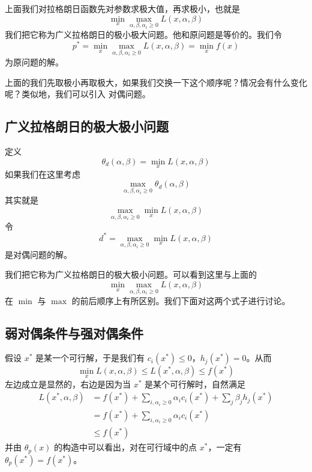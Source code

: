 上面我们对拉格朗日函数先对参数求极大值，再求极小，也就是
\begin{equation}
\min_x\max_{\alpha,\beta,\alpha_i\geqslant0}L(x,\alpha,\beta)
\end{equation}
我们把它称为广义拉格朗日的极小极大问题。他和原问题是等价的。我们令
\begin{equation}
p^*=
\min_x\max_
{\alpha,\beta,\alpha_i\geqslant0}L(x,\alpha,\beta)
=\min_x f(x)
\end{equation}
为原问题的解。

上面的我们先取极小再取极大，如果我们交换一下这个顺序呢？情况会有什么变化呢？类似地，我们可以引入
对偶问题。

\subsection{广义拉格朗日的极大极小问题}

定义
\begin{equation}
\theta_d(\alpha, \beta) = \min_{x}
L(x, \alpha, \beta)
\end{equation}
如果我们在这里考虑
\begin{equation}
\max_{\alpha, \beta, \alpha_i\geqslant0}\theta_d(\alpha,\beta)
\end{equation}
其实就是
\begin{equation}
\max_{\alpha,\beta,\alpha_i\geqslant0}\min_xL(x,\alpha,\beta)
\end{equation}
令
\begin{equation}
d^* =\max_{\alpha,\beta,\alpha_i\geqslant0}\min_xL(x,\alpha,\beta)
\end{equation}
是对偶问题的解。

我们把它称为广义拉格朗日的极大极小问题。可以看到这里与上面的
\begin{equation}
\min_x\max_{\alpha,\beta,\alpha_i\geqslant0}L(x,\alpha,\beta)
\end{equation}
在 $\min$ 与 $\max$ 的前后顺序上有所区别。我们下面对这两个式子进行讨论。

\subsection{弱对偶条件与强对偶条件}

假设 $x^{*}$ 是某一个可行解，于是我们有 $c_i(x^{*}) \leqslant0$，$h_j(x^{*}) =0$。从而
\begin{equation}
\min_x L(x, \alpha, \beta) 
\leqslant L(x^{*}, \alpha, \beta)
\leqslant f(x^{*})
\end{equation}
左边成立是显然的，右边是因为当 $x^{*}$ 是某个可行解时，自然满足 
\begin{equation}
\begin{aligned}
L(x^{*},\alpha,\beta)&=f(x^{*})+\sum_{i,\alpha_i\geqslant0}\alpha_ic_i(x^{*})
+\sum_{j}\beta_jh_j(x^{*}) \\
&=f(x^{*})+\sum_{i,\alpha_i\geqslant0}\alpha_ic_i(x^{*})\\
&\leqslant f(x^{*})
\end{aligned}
\end{equation}
并由 $\theta_p(x)$ 的构造中可以看出，对在可行域中的点 $x^*$，一定有
$\theta_p(x^{*})=f(x^*)$。

